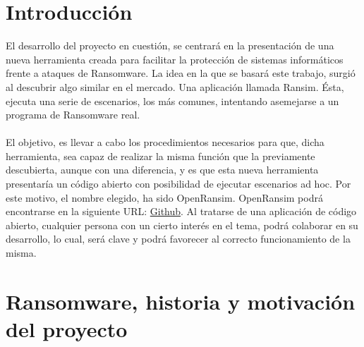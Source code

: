 \documentclass[a4paper,12pt]{article}
\begin{document}
\section{Introducción}
El desarrollo del proyecto en cuestión, se centrará en la presentación de una nueva herramienta creada para facilitar la protección de sistemas informáticos frente a ataques de Ransomware. La idea en la que se basará este trabajo, surgió al descubrir algo similar en el mercado. Una aplicación llamada Ransim. Ésta, ejecuta una serie de escenarios, los más comunes, intentando asemejarse a un programa de Ransomware real.\\\\
El objetivo, es llevar a cabo los procedimientos necesarios para que, dicha herramienta, sea capaz de realizar la misma función que la previamente descubierta, aunque con una diferencia, y es que esta nueva herramienta presentaría un código abierto con posibilidad de ejecutar escenarios ad hoc. Por este motivo, el nombre elegido, ha sido OpenRansim. OpenRansim podrá encontrarse en la siguiente URL: \href{https://github.com/iserranos/OpenRansim}{Github}. 
Al tratarse de una aplicación de código abierto, cualquier persona con un cierto interés en el tema, podrá colaborar en su desarrollo, lo cual, será clave y podrá favorecer al correcto funcionamiento de la misma.
 

\section{Ransomware, historia y motivación del proyecto}
\end{document}
